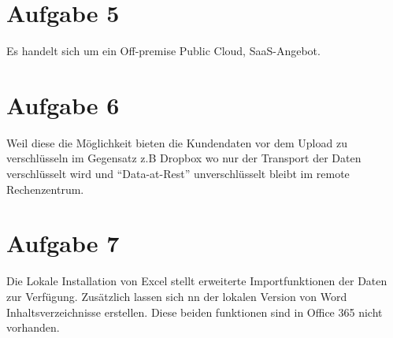 \documentclass[9pt,a4paper]{article} %
\begin{document}
\section*{Aufgabe 5}
Es handelt sich um ein Off-premise Public Cloud, SaaS-Angebot.

\section*{Aufgabe 6}
Weil diese die Möglichkeit bieten die Kundendaten vor dem Upload zu verschlüsseln im Gegensatz z.B Dropbox wo nur der Transport der Daten verschlüsselt wird und ``Data-at-Rest'' unverschlüsselt bleibt im remote Rechenzentrum.

\section*{Aufgabe 7}
Die Lokale Installation von Excel stellt erweiterte Importfunktionen der Daten zur Verfügung. Zusätzlich lassen sich nn der lokalen Version von Word Inhaltsverzeichnisse erstellen. Diese beiden funktionen sind in Office 365 nicht vorhanden.





\end{document}
